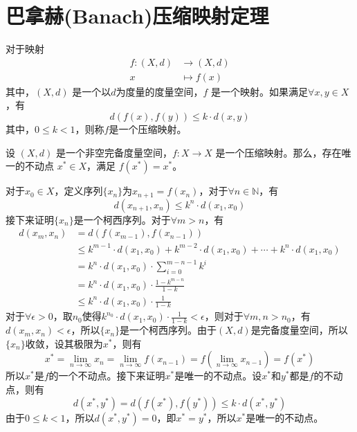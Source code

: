 \section{巴拿赫(Banach)压缩映射定理}
\begin{defn}[压缩映射]\label{def:comp_map}
    对于映射
\begin{align*}
    f : (X,d) & \to (X,d) \\
    x & \mapsto f(x)
\end{align*}
其中，$(X,d)$ 是一个以$d$为度量的度量空间，$f$ 是一个映射。如果满足$\forall x, y \in X$，有
\begin{equation}
    d(f(x), f(y)) \leq k \cdot d(x, y)
\end{equation}
其中，$0 \leq k < 1$，则称$f$是一个压缩映射。
\end{defn}

\begin{thm}[巴拿赫压缩映射定理]\label{thm:banach}
    设 $(X, d)$ 是一个非空完备度量空间，$f : X \to X$ 是一个压缩映射。那么，存在唯一的不动点 $x^* \in X$，满足 $f(x^*) = x^*$。
\end{thm}
\begin{pf}
    对于$x_0 \in X$，定义序列$\{x_n\}$为$x_{n+1}=f(x_n)$，对于$\forall n \in \mathbb{N}$，有
    \begin{equation*}
        d(x_{n+1}, x_n)  \leq k^n \cdot d(x_1, x_0)
    \end{equation*}
    接下来证明$\{x_n\}$是一个柯西序列。对于$\forall m > n$，有
    \begin{align*}
        d(x_m, x_n) & = d(f(x_{m-1}), f(x_{n-1})) \\
        & \leq k^{m-1} \cdot d(x_1, x_0) + k^{m-2} \cdot d(x_1, x_0) + \cdots + k^{n} \cdot d(x_1, x_0) \\
        & = k^n \cdot d(x_1, x_0) \cdot \sum_{i=0}^{m-n-1} k^i \\
        & = k^n \cdot d(x_1, x_0) \cdot \frac{1-k^{m-n}}{1-k} \\
        & \leq k^n \cdot d(x_1, x_0) \cdot \frac{1}{1-k}
    \end{align*}
    对于$\forall \epsilon > 0$，取$n_0$使得$k^{n_0} \cdot d(x_1, x_0) \cdot \frac{1}{1-k} < \epsilon$，则对于$\forall m, n > n_0$，有$d(x_m, x_n) < \epsilon$，所以$\{x_n\}$是一个柯西序列。由于$(X, d)$是完备度量空间，所以$\{x_n\}$收敛，设其极限为$x^*$，则有
    \begin{equation*}
        x^* = \lim_{n \to \infty} x_n = \lim_{n \to \infty} f(x_{n-1}) = f(\lim_{n \to \infty} x_{n-1}) = f(x^*)
    \end{equation*}
    所以$x^*$是$f$的一个不动点。接下来证明$x^*$是唯一的不动点。设$x^*$和$y^*$都是$f$的不动点，则有
    \begin{equation*}
        d(x^*, y^*) = d(f(x^*), f(y^*)) \leq k \cdot d(x^*, y^*)
    \end{equation*}
    由于$0 \leq k < 1$，所以$d(x^*, y^*) = 0$，即$x^* = y^*$，所以$x^*$是唯一的不动点。
\end{pf}

